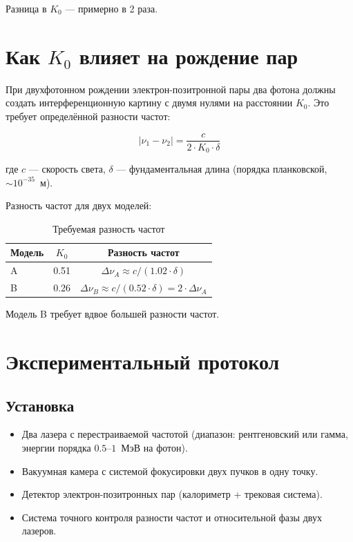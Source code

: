 \documentclass[12pt,a4paper]{article}
\begin{document}
Разница в $K_0$ — примерно в 2 раза.

\section{Как $K_0$ влияет на рождение пар}
При двухфотонном рождении электрон-позитронной пары два фотона должны создать интерференционную картину с двумя нулями на расстоянии $K_0$. Это требует определённой разности частот:

\begin{equation}
    |\nu_1 - \nu_2| = \frac{c}{2 \cdot K_0 \cdot \delta}
\end{equation}

где $c$ — скорость света, $\delta$ — фундаментальная длина (порядка планковской, $\sim 10^{-35}$~м).

Разность частот для двух моделей:

\begin{table}[h]
    \centering
    \caption{Требуемая разность частот}
    \begin{tabular}{lcc}
        \toprule
        Модель & $K_0$ & Разность частот \\
        \midrule
        A & 0.51 & $\Delta\nu_A \approx c / (1.02 \cdot \delta)$ \\
        B & 0.26 & $\Delta\nu_B \approx c / (0.52 \cdot \delta) = 2 \cdot \Delta\nu_A$ \\
        \bottomrule
    \end{tabular}
    \label{tab:frequencies}
\end{table}

Модель B требует вдвое большей разности частот.

\section{Экспериментальный протокол}

\subsection{Установка}
\begin{itemize}
    \item Два лазера с перестраиваемой частотой (диапазон: рентгеновский или гамма, энергии порядка $0.5$--$1$~МэВ на фотон).
    \item Вакуумная камера с системой фокусировки двух пучков в одну точку.
    \item Детектор электрон-позитронных пар (калориметр + трековая система).
    \item Система точного контроля разности частот и относительной фазы двух лазеров.
\end{itemize}
\end{document}
